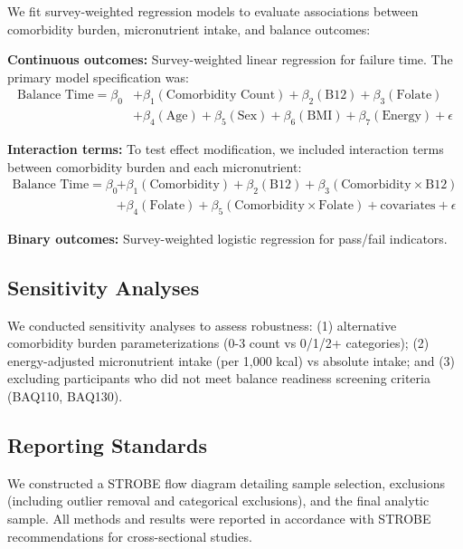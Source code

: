\documentclass[11pt,a4paper]{article}
\begin{document}
We fit survey-weighted regression models to evaluate associations between comorbidity burden, micronutrient intake, and balance outcomes:

\textbf{Continuous outcomes:} Survey-weighted linear regression for failure time. The primary model specification was:
\begin{equation}
\begin{split}
\text{Balance Time} = \beta_0 &+ \beta_1(\text{Comorbidity Count}) + \beta_2(\text{B12}) + \beta_3(\text{Folate}) \\
&+ \beta_4(\text{Age}) + \beta_5(\text{Sex}) + \beta_6(\text{BMI}) + \beta_7(\text{Energy}) + \epsilon
\end{split}
\end{equation}

\textbf{Interaction terms:} To test effect modification, we included interaction terms between comorbidity burden and each micronutrient:
\begin{equation}
\begin{split}
\text{Balance Time} = \beta_0 &+ \beta_1(\text{Comorbidity}) + \beta_2(\text{B12}) + \beta_3(\text{Comorbidity} \times \text{B12}) \\
&+ \beta_4(\text{Folate}) + \beta_5(\text{Comorbidity} \times \text{Folate}) + \text{covariates} + \epsilon
\end{split}
\end{equation}

\textbf{Binary outcomes:} Survey-weighted logistic regression for pass/fail indicators.

\subsection{Sensitivity Analyses}

We conducted sensitivity analyses to assess robustness: (1) alternative comorbidity burden parameterizations (0-3 count vs 0/1/2+ categories); (2) energy-adjusted micronutrient intake (per 1,000 kcal) vs absolute intake; and (3) excluding participants who did not meet balance readiness screening criteria (BAQ110, BAQ130).

\subsection{Reporting Standards}

We constructed a STROBE flow diagram detailing sample selection, exclusions (including outlier removal and categorical exclusions), and the final analytic sample. All methods and results were reported in accordance with STROBE recommendations for cross-sectional studies.
\end{document}
